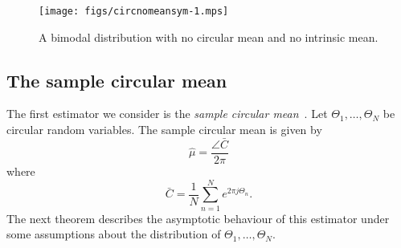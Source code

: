 \documentclass[journal]{IEEEtran}
\begin{document}
\begin{figure}[tp]
	\centering
		\texttt{[image: figs/circnomeansym-1.mps]}
		\caption{A bimodal distribution with no circular mean and no intrinsic mean.}
		\label{fig:circnomeanbimodal}
\end{figure}


\subsection{The sample circular mean}\label{sec:sample-circular-mean}

The first estimator we consider is the \emph{sample circular mean}~\cite[p.~15]{Mardia_directional_statistics}\cite{Fisher1993,Jammalamadaka_dir_stat_book}.  Let $\Theta_1, \dots, \Theta_N$ be circular random variables. The sample circular mean is given by
\[
\hat{\mu} = \frac{\angle{\bar{C}}}{2\pi}
\]
where
\[
\bar{C} = \frac{1}{N}\sum_{n=1}^{N}e^{2\pi j \Theta_n}. 
\]  
The next theorem describes the asymptotic behaviour of this estimator under some assumptions about the distribution of $\Theta_1, \dots, \Theta_N$.


\end{document}
